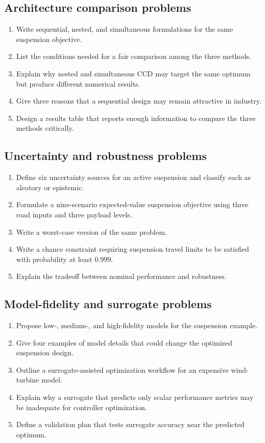 \documentclass[11pt]{article}
\begin{document}
\subsection*{Architecture comparison problems}
\begin{enumerate}[leftmargin=1.5em,label=\textbf{P\arabic*.},resume]
  \item Write sequential, nested, and simultaneous formulations for the same suspension objective.
  \item List the conditions needed for a fair comparison among the three methods.
  \item Explain why nested and simultaneous CCD may target the same optimum but produce different numerical results.
  \item Give three reasons that a sequential design may remain attractive in industry.
  \item Design a results table that reports enough information to compare the three methods critically.
\end{enumerate}

\subsection*{Uncertainty and robustness problems}
\begin{enumerate}[leftmargin=1.5em,label=\textbf{P\arabic*.},resume]
  \item Define six uncertainty sources for an active suspension and classify each as aleatory or epistemic.
  \item Formulate a nine-scenario expected-value suspension objective using three road inputs and three payload levels.
  \item Write a worst-case version of the same problem.
  \item Write a chance constraint requiring suspension travel limits to be satisfied with probability at least 0.999.
  \item Explain the tradeoff between nominal performance and robustness.
\end{enumerate}

\subsection*{Model-fidelity and surrogate problems}
\begin{enumerate}[leftmargin=1.5em,label=\textbf{P\arabic*.},resume]
  \item Propose low-, medium-, and high-fidelity models for the suspension example.
  \item Give four examples of model details that could change the optimized suspension design.
  \item Outline a surrogate-assisted optimization workflow for an expensive wind-turbine model.
  \item Explain why a surrogate that predicts only scalar performance metrics may be inadequate for controller optimization.
  \item Define a validation plan that tests surrogate accuracy near the predicted optimum.
\end{enumerate}
\end{document}
